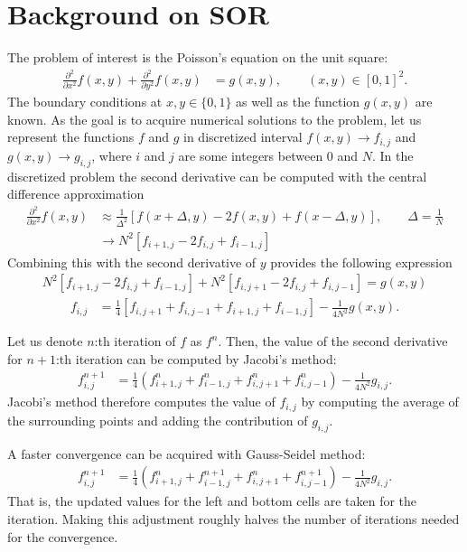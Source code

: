 \documentclass[12pt, letterpaper]{article}
\begin{document}
\section{Background on SOR}
The problem of interest is the Poisson's equation on the unit square:
\begin{align*}
  \frac{\partial^2}{\partial x^2}f(x,y)
  +\frac{\partial^2}{\partial y^2}f(x,y)
  &=g(x,y),\qquad(x,y)\in[0,1]^2.
\end{align*}
The boundary conditions at $x,y\in \{0,1\}$ as well as the function $g(x,y)$ are known.
As the goal is to acquire numerical solutions to the problem, let us represent the functions $f$ and $g$ in discretized interval $f(x,y)\to f_{i,j}$ and $g(x,y)\to g_{i,j}$, where $i$ and $j$ are some integers between $0$ and $N$.
In the discretized problem the second derivative can be computed with the central difference approximation
\begin{align*}
  \frac{\partial^2}{\partial x^2}f(x,y)
  &\approx \frac{1}{\Delta^2} \left[f(x+\Delta,y)-2f(x,y)+f(x-\Delta,y)\right],\qquad \Delta= \frac{1}{N}\\
  &\to {N^2} \left[f_{i+1,j}-2f_{i,j}+f_{i-1,j}\right]
\end{align*}
Combining this with the second derivative of $y$ provides the following expression
\begin{align*}
  N^2\left[f_{i+1,j}-2f_{i,j}+f_{i-1,j}\right]
  +N^2\left[f_{i,j+1}-2f_{i,j}+f_{i,j-1}\right]
  = g(x,y)
\end{align*}
\begin{align*}
  f_{i,j}
  &= \frac{1}{4}\left[f_{i,j+1}+f_{i,j-1}+f_{i+1,j}+f_{i-1,j}\right] -\frac{1}{4N^2}g(x,y).
\end{align*}

Let us denote $n$:th iteration of $f$ as $f^n$.
Then, the value of the second derivative for ${n+1}$:th iteration can be computed by Jacobi's method:
\begin{align*}
  f_{i,j}^{n+1} &= \frac{1}{4}(f_{i+1,j}^{n}+ f_{i-1,j}^{n}+ f_{i,j+1}^{n}+ f_{i,j-1}^{n} ) -\frac{1}{4N^2}g_{i,j}.
\end{align*}
Jacobi's method therefore computes the value of $f_{i,j}$ by computing the average of the surrounding points and adding the contribution of $g_{i,j}$. 

A faster convergence can be acquired with Gauss-Seidel method:
\begin{align*}
  f_{i,j}^{n+1} &= \frac{1}{4}(f_{i+1,j}^{n}+ f_{i-1,j}^{n+1}+ f_{i,j+1}^{n}+ f_{i,j-1}^{n+1} ) -\frac{1}{4N^2}g_{i,j}.
\end{align*}
That is, the updated values for the left and bottom cells are taken for the iteration.
Making this adjustment roughly halves the number of iterations needed for the convergence\cite{NumRec}.
\end{document}

